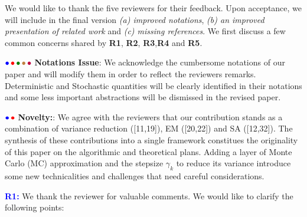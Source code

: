 \documentclass{article}
\begin{document}
We would like to thank the five reviewers for their feedback. Upon acceptance, we will include in the final version \emph{{\sf (a)} improved notations}, \emph{{\sf (b)} an improved presentation of related work} and \emph{{\sf (c)} missing references}. 
We first discuss a few common concerns shared by \textbf{\color{blue}R1}, \textbf{\color{red} R2}, \textbf{\color{green!50!black}R3},\textbf{\color{brown}R4} and \textbf{\color{purple}R5}.

${\color{blue}\bullet}\!~{\color{red}\bullet}\!~{\color{green!50!black}\bullet}\!~{\color{brown}\bullet}\!~{\color{purple}\bullet}$ \textbf{Notations Issue}: 
We acknowledge the cumbersome notations of our paper and will modify them in order to reflect the reviewers remarks. 
Deterministic and Stochastic quantities will be clearly identified in their notations and some less important abstractions will be dismissed in the revised paper.


${\color{blue}\bullet}\!~{\color{red}\bullet}$ \textbf{Novelty:}: 
We agree with the reviewers that our contribution stands as a combination of variance reduction ([11,19]), EM ([20,22]) and SA ([12,32]). 
The synthesis of these contributions into a single framework constitues the originality of this paper on the algorithmic and theoretical plans.
Adding a layer of Monte Carlo (MC) approximation and the stepsize $\gamma_k$ to reduce its variance introduce some new technicalities and challenges that need careful considerations.\vspace{-0.05in}





\textbf{\textcolor{blue}{R1:}} We thank the reviewer for valuable comments. We would like to clarify the following points:\vspace{-0.05in}

\end{document}
